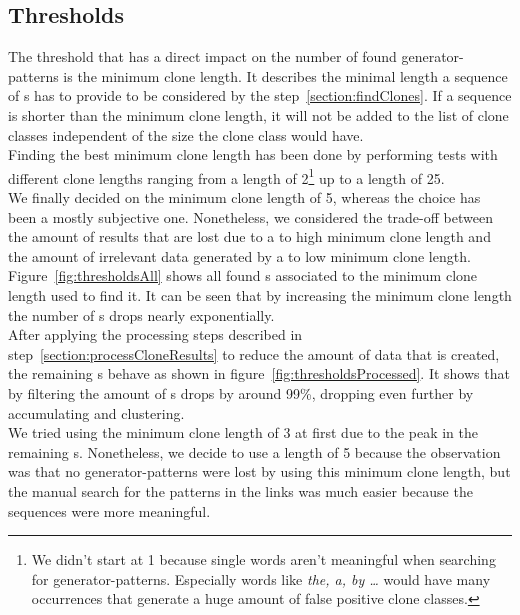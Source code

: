 \subsection{Thresholds}
The threshold that has a direct impact on the number of found generator-patterns is the minimum clone length. It describes the minimal length a sequence of s has to provide to be considered by the step~\ref{section:findClones}. If a sequence is shorter than the minimum clone length, it will not be added to the list of clone classes independent of the size the clone class would have.\\
Finding the best minimum clone length has been done by performing tests with different clone lengths ranging from a length of 2\footnote{We didn't start at 1 because single words aren't meaningful when searching for generator-patterns. Especially words like \textit{the, a, by \dots} would have many occurrences that generate a huge amount of false positive clone classes.} up to a length of 25.\\
We finally decided on the minimum clone length of 5, whereas the choice has been a mostly subjective one. Nonetheless, we considered the trade-off between the amount of results that are lost due to a to high minimum clone length and the amount of irrelevant data generated by a to low minimum clone length.\\
Figure~\ref{fig:thresholdsAll} shows all found s associated to the minimum clone length used to find it. It can be seen that by increasing the minimum clone length the number of s drops nearly exponentially. \\
After applying the processing steps described in step~\ref{section:processCloneResults} to reduce the amount of data that is created, the remaining s behave as shown in figure~\ref{fig:thresholdsProcessed}. It shows that by filtering the amount of s drops by around 99\%, dropping even further by accumulating and clustering.\\
We tried using the minimum clone length of 3 at first due to the peak in the remaining s. Nonetheless, we decide to use a length of 5 because the observation was that no generator-patterns were lost by using this minimum clone length, but the manual search for the patterns in the links was much easier because the sequences were more meaningful.



